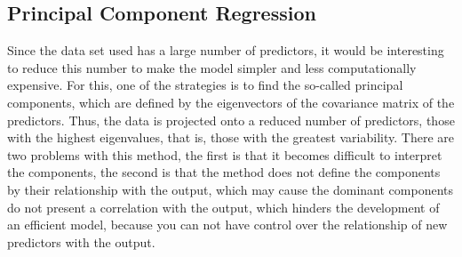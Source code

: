 \subsection{Principal Component Regression}
Since the data set used has a large number of predictors, it would be interesting to reduce this number to make the model simpler and less computationally expensive.
 For this, one of the strategies is to find the so-called principal components, which are defined by the eigenvectors of the covariance matrix of the predictors. Thus, the data is projected onto a reduced number of predictors, those with the highest eigenvalues, that is, those with the greatest variability. There are two problems with this method, the first is that it becomes difficult to interpret the components, the second is that the method does not define the components by their relationship with the output, which may cause the dominant components do not present a correlation with the output, which hinders the development of an efficient model, because you can not have control over the relationship of new predictors with the output.

